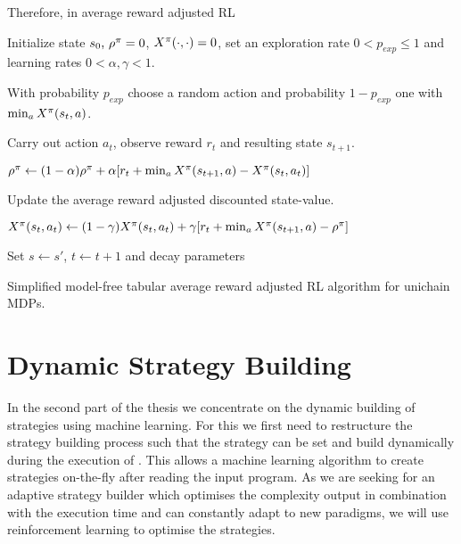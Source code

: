 \documentclass[envcountsame]{llncs}
\begin{document}
Therefore, in average reward adjusted RL 

\begin{algorithm}[t!]
  \begin{algorithmic}[1]
    \State{}Initialize state \(s_{0}$, $\avgrew^{\pol} = 0\), \(X^{\pi}(\cdot, \cdot) = 0\), set
    an exploration rate \(0 < p_{exp} \leqslant 1\) and learning rates \(0 < \alpha, \gamma <
    1\).
    \State{}
    \begin{minipage}[t]{0.9\textwidth} With probability \(p_{exp}\) choose a random action
      and probability \(1-p_{exp}\) one with \(\min_{a} X^{\pi}(s_{t},a)\).
    \end{minipage}
    \State{}Carry out action \(a_{t}\), observe reward \(r_{t}\) and resulting state \(s_{t+1}\).
    \State{}
    \begin{minipage}{0.9\textwidth}
      \centering
      \(\rho^{\pi}  \gets (1- \alpha) \rho^{\pi} + \alpha [r_{t} + \min_{a}X^\pi(s_{t+1},a) - X^\pi(s_{t},a_{t})]\)
    \end{minipage}
    \EndIf
    \State{}Update the average reward adjusted discounted state-value.
    \State{}
    \begin{minipage}{0.9\textwidth}
      \centering
      \(X^\pi(s_{t},a_{t}) \gets (1-\gamma) X^\pi(s_{t},a_{t}) + \gamma [r_{t} + \min_{a} X^\pi(s_{t+1},a) - \rho^{\pi}]\)
    \end{minipage}

    \State{}Set \(s \gets s'\), \(t \gets t+1\) and decay parameters
    \EndWhile{}
  \end{algorithmic}
  \caption{\label{alg:near}Simplified model-free tabular average reward adjusted RL algorithm for unichain MDPs.}
\end{algorithm}


\section{Dynamic Strategy Building}


In the second part of the thesis we concentrate on the dynamic building of strategies using machine
learning. For this we first need to restructure the strategy building process such that the strategy
can be set and build dynamically during the execution of \tct{}. This allows a machine learning
algorithm to create strategies on-the-fly after reading the input program. As we are seeking for an
adaptive strategy builder which optimises the complexity output in combination with the execution
time and can constantly adapt to new paradigms, we will use reinforcement learning to optimise the
strategies.
\end{document}
